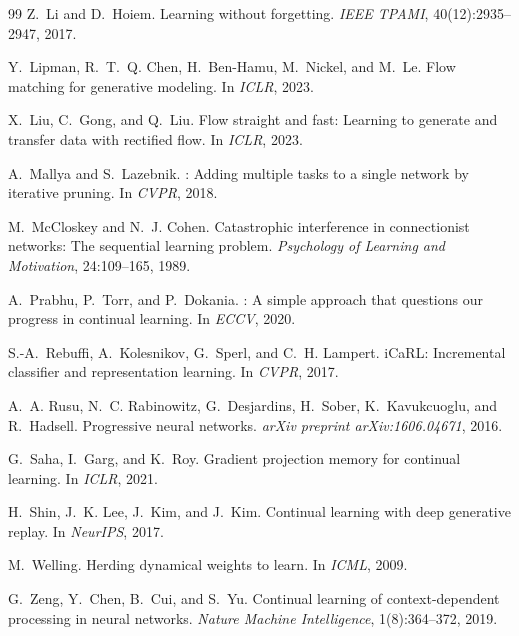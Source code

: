 \documentclass[10pt,twocolumn,letterpaper]{article}
\begin{document}
{\begin{thebibliography}{99}
Z.~Li and D.~Hoiem.
\newblock Learning without forgetting.
\newblock \textit{IEEE TPAMI}, 40(12):2935--2947, 2017.

Y.~Lipman, R.~T.~Q. Chen, H.~Ben-Hamu, M.~Nickel, and M.~Le.
\newblock Flow matching for generative modeling.
\newblock In \textit{ICLR}, 2023.

X.~Liu, C.~Gong, and Q.~Liu.
\newblock Flow straight and fast: Learning to generate and transfer data with rectified flow.
\newblock In \textit{ICLR}, 2023.

A.~Mallya and S.~Lazebnik.
: Adding multiple tasks to a single network by iterative pruning.
\newblock In \textit{CVPR}, 2018.

M.~McCloskey and N.~J. Cohen.
\newblock Catastrophic interference in connectionist networks: The sequential learning problem.
\newblock \textit{Psychology of Learning and Motivation}, 24:109--165, 1989.

A.~Prabhu, P.~Torr, and P.~Dokania.
: A simple approach that questions our progress in continual learning.
\newblock In \textit{ECCV}, 2020.

S.-A.~Rebuffi, A.~Kolesnikov, G.~Sperl, and C.~H. Lampert.
\newblock i{C}a{RL}: Incremental classifier and representation learning.
\newblock In \textit{CVPR}, 2017.

A.~A. Rusu, N.~C. Rabinowitz, G.~Desjardins, H.~Sober, K.~Kavukcuoglu, and R.~Hadsell.
\newblock Progressive neural networks.
\newblock \textit{arXiv preprint arXiv:1606.04671}, 2016.

G.~Saha, I.~Garg, and K.~Roy.
\newblock Gradient projection memory for continual learning.
\newblock In \textit{ICLR}, 2021.

H.~Shin, J.~K. Lee, J.~Kim, and J.~Kim.
\newblock Continual learning with deep generative replay.
\newblock In \textit{NeurIPS}, 2017.

M.~Welling.
\newblock Herding dynamical weights to learn.
\newblock In \textit{ICML}, 2009.

G.~Zeng, Y.~Chen, B.~Cui, and S.~Yu.
\newblock Continual learning of context-dependent processing in neural networks.
\newblock \textit{Nature Machine Intelligence}, 1(8):364--372, 2019.


\end{thebibliography}}
\end{document}
